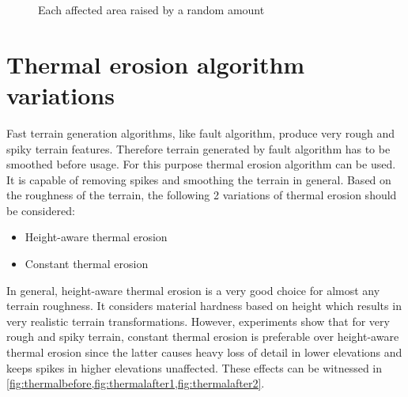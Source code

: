 \documentclass[11pt,a4paper,twoside,openright]{report}
\begin{document}
\begin{figure}[!htb]
  \caption{Each affected area raised by a random amount}\label{fig:mountainrangealteration}
\endminipage
\end{figure}

\section{Thermal erosion algorithm variations}
Fast terrain generation algorithms, like fault algorithm, produce very rough and spiky terrain features. Therefore terrain generated by fault algorithm has to be smoothed before usage. For this purpose thermal erosion algorithm can be used. It is capable of removing spikes and smoothing the terrain in general. Based on the roughness of the terrain, the following 2 variations of thermal erosion should be considered:
\begin{itemize}
  \item Height-aware thermal erosion
  \item Constant thermal erosion
\end{itemize}
In general, height-aware thermal erosion is a very good choice for almost any terrain roughness. It considers material hardness based on height which results in very realistic terrain transformations. However, experiments show that for very rough and spiky terrain, constant thermal erosion is preferable over height-aware thermal erosion since the latter causes heavy loss of detail in lower elevations and keeps spikes in higher elevations unaffected. These effects can be witnessed in \cref{fig:thermalbefore,fig:thermalafter1,fig:thermalafter2}.
\end{document}
